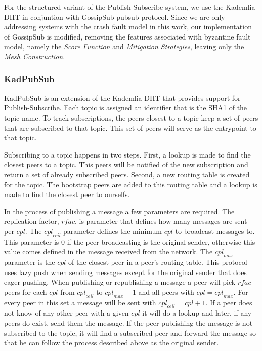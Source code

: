 \documentclass[sigconf]{acmart}
\begin{document}
For the structured variant of the Publish-Subscribe system, we use the Kademlia DHT in conjuntion with GossipSub pubsub protocol.
Since we are only addressing systems with the crash fault model in this work, our implementation of GossipSub is modified, removing the features associated with byzantine fault model, namely the \textit{Score Function} and \textit{Mitigation Strategies}, leaving only the \textit{Mesh Construction}.
% 
% 
% 





% 

\subsubsection{KadPubSub}
KadPubSub is an extension of the Kademlia DHT that provides support for Publish-Subscribe.
Each topic is assigned an identifier that is the SHA1 of the topic name.
To track subscriptions, the peers closest to a topic keep a set of peers that are subscribed to that topic. This set of peers will serve as the entrypoint to that topic.


Subscribing to a topic happens in two steps.
First, a lookup is made to find the closest peers to a topic.
This peers will be notified of the new subscription and return a set of already subscribed peers.
Second, a new routing table is created for the topic. The bootstrap peers are added to this routing table and a lookup is made to find the closest peer to ourselfs.

In the process of publishing a message a few parameters are required.
The replication factor, $\mathit{rfac}$, is parameter that defines how many messages are sent per $\mathit{cpl}$.
The $\mathit{cpl}_{ceil}$ parameter defines the minimum $\mathit{cpl}$ to broadcast messages to. This parameter is $0$ if the peer broadcasting is the original sender, otherwise this value comes defined in the message received from the network.
The $\mathit{cpl}_{max}$ parameter is the $cpl$ of the closest peer in a peer's routing table.
This protocol uses lazy push when sending messages except for the original sender that does eager pushing.
When publishing or republishing a message a peer will pick $\mathit{rfac}$ peers for each $\mathit{cpl}$ from $\mathit{cpl}_{ceil}$ to $\mathit{cpl}_{max} - 1$ and all peers with $\mathit{cpl} = \mathit{cpl}_{max}$.
For every peer in this set a message will be sent with $\mathit{cpl}_{ceil} = \mathit{cpl} + 1$. If a peer does not know of any other peer with a given $\mathit{cpl}$ it will do a lookup and later, if any peers do exist, send them the message.
If the peer publishing the message is not subscribed to the topic, it will find a subscribed peer and forward the message so that he can follow the process described above as the original sender.
\end{document}

